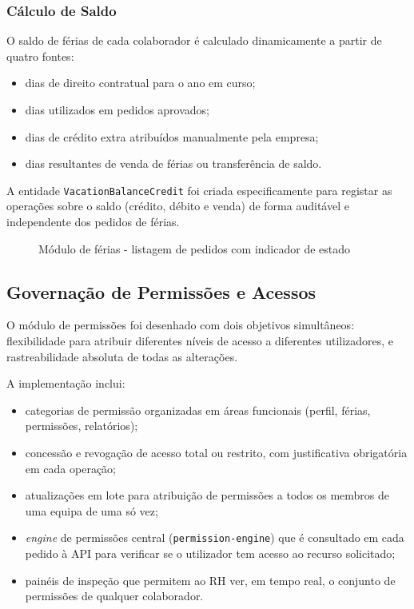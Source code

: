 \documentclass[12pt, a4paper, twoside, openright]{report}
\begin{document}
\subsubsection{Cálculo de Saldo}

O saldo de férias de cada colaborador é calculado dinamicamente a partir de quatro fontes:

\begin{itemize}
  \item dias de direito contratual para o ano em curso;
  \item dias utilizados em pedidos aprovados;
  \item dias de crédito extra atribuídos manualmente pela empresa;
  \item dias resultantes de venda de férias ou transferência de saldo.
\end{itemize}

A entidade \texttt{VacationBalanceCredit} foi criada especificamente para registar
as operações sobre o saldo (crédito, débito e venda) de forma auditável e
independente dos pedidos de férias.

\begin{figure}[H]
  \centering
  \caption{Módulo de férias - listagem de pedidos com indicador de estado}
  \label{fig:ferias}
\end{figure}

\subsection{Governação de Permissões e Acessos}

O módulo de permissões foi desenhado com dois objetivos simultâneos: flexibilidade
para atribuir diferentes níveis de acesso a diferentes utilizadores, e rastreabilidade
absoluta de todas as alterações.

A implementação inclui:

\begin{itemize}
  \item categorias de permissão organizadas em áreas funcionais (perfil, férias,
        permissões, relatórios);
  \item concessão e revogação de acesso total ou restrito, com justificativa obrigatória
        em cada operação;
  \item atualizações em lote para atribuição de permissões a todos os membros de
        uma equipa de uma só vez;
  \item \textit{engine} de permissões central (\texttt{permission-engine}) que é
        consultado em cada pedido à API para verificar se o utilizador tem acesso
        ao recurso solicitado;
  \item painéis de inspeção que permitem ao RH ver, em tempo real, o conjunto de
        permissões de qualquer colaborador.
\end{itemize}
\end{document}
